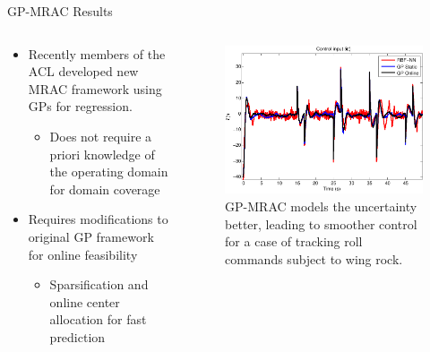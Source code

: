 \documentclass[11pt,mathserif]{beamer}
\begin{document}
\begin{frame}[t]{GP-MRAC Results}
\begin{columns}[T]
	\begin{column}{.5\textwidth}
	\begin{itemize}	\itemsep 0.1in
        \item Recently members of the ACL developed new MRAC framework using GPs for regression.
          \begin{itemize}
          \item Does not require a priori knowledge of the operating
            domain for domain coverage
          \end{itemize}
          \item Requires modifications to original GP framework for
            online feasibility
            \begin{itemize}
\item Sparsification and online center allocation for fast prediction
\end{itemize}
      
	\end{itemize}
	\end{column}
	
	\begin{column}{.5\textwidth}
\begin{figure}
	\includegraphics[width=\columnwidth]{figures/ControlInstance.pdf}
\caption{GP-MRAC models the uncertainty better, leading to smoother
  control for a case of tracking roll commands subject to wing rock.}
\end{figure}
	\end{column}		
\end{columns}

\end{frame}
\end{document}
